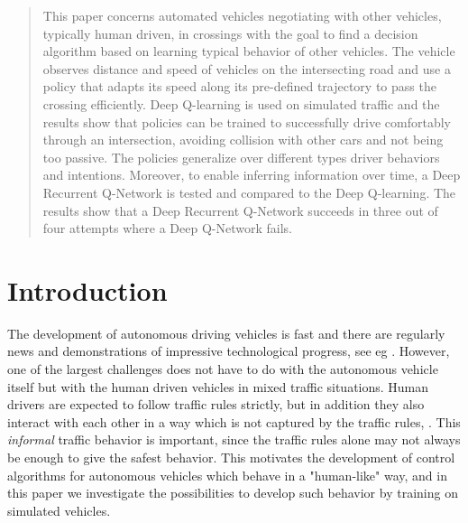 
\newcommand {\matr}[2]{\left[\begin{array}{#1}#2\end{array}\right]}

\begin{abstract}
This paper concerns automated vehicles negotiating with other vehicles, typically human driven, in crossings with the goal to find a decision algorithm based on learning typical behavior of other vehicles. The vehicle observes distance and speed of vehicles on the intersecting road and use a policy that adapts its speed along its pre-defined trajectory to pass the crossing efficiently.
Deep Q-learning is used on simulated traffic and the results show that policies can be trained to successfully drive comfortably through an intersection, avoiding collision with other cars and not being too passive. The policies generalize over different types driver behaviors and intentions.
Moreover, to enable inferring information over time, a Deep Recurrent Q-Network is tested and compared to the Deep Q-learning. The results show that a Deep Recurrent Q-Network succeeds in three out of four attempts where a Deep Q-Network fails.

\end{abstract}

\section{Introduction}
The development of autonomous driving vehicles is fast and there are regularly news and demonstrations of impressive technological progress, see eg \cite{Bojarski2016EndCars}. However, one of the largest challenges does not have to do with the autonomous vehicle itself but with the human driven vehicles in mixed traffic situations. Human drivers are expected to follow traffic rules strictly, but in addition they also interact with each other in a way which is not captured by the traffic rules,  \cite{Liebner2012DriverModel, Lefevre2012EvaluatingIntentions}. This {\em informal} traffic behavior is important, since the traffic rules alone may not always be enough to give the safest behavior. This motivates the development of control algorithms for autonomous vehicles which behave in a "human-like" way, and in this paper we investigate the possibilities to develop such behavior by training on simulated vehicles. 

